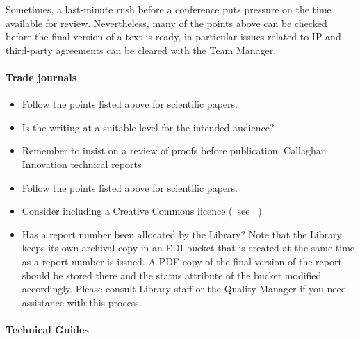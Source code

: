 Sometimes, a last-minute rush before a conference puts pressure on the time available for review. Nevertheless, many of the points above can be checked before the final version of a text is ready, in particular issues related to IP and third-party agreements can be cleared with the Team Manager.

\paragraph{Trade journals}
\begin{itemize}
\item  Follow the points listed above for scientific papers.
\item  Is the writing at a suitable level for the intended audience?
\item  Remember to insist on a review of proofs before publication.
 Callaghan Innovation technical reports
\item  Follow the points listed above for scientific papers.
\item  Consider including a Creative Commons licence (~see \cite[\S\ref*{GRP-s_copyright}]{MSL_Reporting_Guidelines}~).
\item  Has a report number been allocated by the Library? Note that the Library keeps its own archival copy in an EDI bucket that is created at the same time as a report number is issued. A PDF copy of the final version of the report should be stored there and the status attribute of the bucket modified accordingly. Please consult Library staff or the Quality Manager if you need assistance with this process.
\end{itemize} 

\paragraph{Technical Guides}


